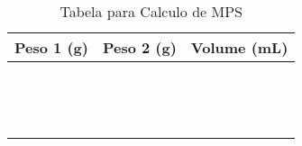 \documentclass[a4paper,10pt]{SelfArx}
\begin{document}
\begin{table}[H]
\centering
\begin{tabular}{|l|c|r|}
\hline
\hline
Peso 1 (g) & Peso 2 (g) & Volume (mL) \\
\hline
\hline
&  &   \\
\hline
&  &   \\
\hline
&  &   \\
\hline
&  &   \\
\hline
&  &   \\
\hline
&  &   \\
\hline
&  &   \\
\hline
&  &   \\
\hline
&  &   \\
\hline
&  &   \\
\hline
&  &   \\
\hline
&  &   \\
\hline
&  &   \\
\hline
&  &   \\  [1ex] %
\hline

\hline
\end{tabular}
\caption{Tabela para Calculo de MPS}
\label{ex:Tabela 1}
\end{table}
\end{document}
